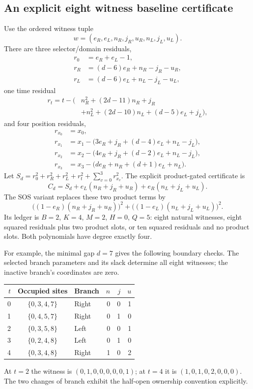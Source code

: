 \documentclass[11pt,letterpaper]{article}
\numberwithin{equation}{section}
\theoremstyle{definition}
\theoremstyle{remark}
\begin{document}
\subsection{An explicit eight witness baseline certificate}\label{smc:tq:sec:binaryformula}
Use the ordered witness tuple
\[
 w=(e_R,e_L,n_R,j_R,u_R,n_L,j_L,u_L).
\]
There are three selector/domain residuals,
\begin{align*}
 r_0&=e_R+e_L-1,\\
 r_R&=(d-6)e_R+n_R-j_R-u_R,\\
 r_L&=(d-6)e_L+n_L-j_L-u_L,
\end{align*}
one time residual
\begin{align*}
 r_t=t-\bigl(&n_R^2+(2d-11)n_R+j_R\\
             &+n_L^2+(2d-10)n_L+(d-5)e_L+j_L\bigr),
\end{align*}
and four position residuals,
\begin{align*}
 r_{x_0}&=x_0,\\
 r_{x_1}&=x_1-\bigl(3e_R+j_R+(d-4)e_L+n_L-j_L\bigr),\\
 r_{x_2}&=x_2-\bigl(4e_R+j_R+(d-2)e_L+n_L-j_L\bigr),\\
 r_{x_3}&=x_3-\bigl(de_R+n_R+(d+1)e_L+n_L\bigr).
\end{align*}
Let $S_d=r_0^2+r_R^2+r_L^2+r_t^2+\sum_{v=0}^3r_{x_v}^2$.
The explicit product-gated certificate is
\begin{equation}\label{smc:tq:eq:binaryprod}
 C_d=S_d+e_L(n_R+j_R+u_R)+e_R(n_L+j_L+u_L).
\end{equation}
The SOS variant replaces these two product terms by
\[
 \bigl((1-e_R)(n_R+j_R+u_R)\bigr)^2+
 \bigl((1-e_L)(n_L+j_L+u_L)\bigr)^2.
\]
Its ledger is $B=2$, $K=4$, $M=2$, $H=0$, $Q=5$: eight natural witnesses,
eight squared residuals plus two product slots, or ten squared residuals
and no product slots. Both polynomials have degree exactly four.

For example, the minimal gap $d=7$ gives the following boundary checks.
The selected branch parameters and its slack determine all eight witnesses;
the inactive branch's coordinates are zero.
\begin{center}
\begin{tabular}{rclrrr}
\toprule
$t$ & Occupied sites & Branch & $n$ & $j$ & $u$\\
\midrule
0 & $\{0,3,4,7\}$ & Right & 0 & 0 & 1\\
1 & $\{0,4,5,7\}$ & Right & 0 & 1 & 0\\
2 & $\{0,3,5,8\}$ & Left & 0 & 0 & 1\\
3 & $\{0,2,4,8\}$ & Left & 0 & 1 & 0\\
4 & $\{0,3,4,8\}$ & Right & 1 & 0 & 2\\
\bottomrule
\end{tabular}
\end{center}
At $t=2$ the witness is $(0,1,0,0,0,0,0,1)$; at $t=4$ it is
$(1,0,1,0,2,0,0,0)$. The two changes of branch exhibit the half-open
ownership convention explicitly.
\end{document}
